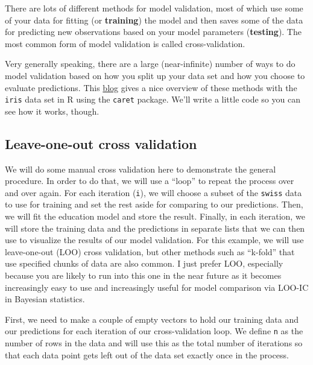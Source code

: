 \documentclass[
]{book}
\begin{document}
There are lots of different methods for model validation, most of which use some of your data for fitting (or \textbf{training}) the model and then saves some of the data for predicting new observations based on your model parameters (\textbf{testing}). The most common form of model validation is called cross-validation.

Very generally speaking, there are a large (near-infinite) number of ways to do model validation based on how you split up your data set and how you choose to evaluate predictions. This \href{http://machinelearningmastery.com/how-to-estimate-model-accuracy-in-r-using-the-caret-package/}{blog} gives a nice overview of these methods with the \texttt{iris} data set in R using the \texttt{caret} package. We'll write a little code so you can see how it works, though.

\hypertarget{leave-one-out-cross-validation}{%
\subsection{Leave-one-out cross validation}\label{leave-one-out-cross-validation}}

We will do some manual cross validation here to demonstrate the general procedure. In order to do that, we will use a ``loop'' to repeat the process over and over again. For each iteration (\texttt{i}), we will choose a subset of the \texttt{swiss} data to use for training and set the rest aside for comparing to our predictions. Then, we will fit the education model and store the result. Finally, in each iteration, we will store the training data and the predictions in separate lists that we can then use to visualize the results of our model validation. For this example, we will use leave-one-out (LOO) cross validation, but other methods such as ``k-fold'' that use specified chunks of data are also common. I just prefer LOO, especially because you are likely to run into this one in the near future as it becomes increasingly easy to use and increasingly useful for model comparison via LOO-IC in Bayesian statistics.

First, we need to make a couple of empty vectors to hold our training data and our predictions for each iteration of our cross-validation loop. We define \texttt{n} as the number of rows in the data and will use this as the total number of iterations so that each data point gets left out of the data set exactly once in the process.
\end{document}
